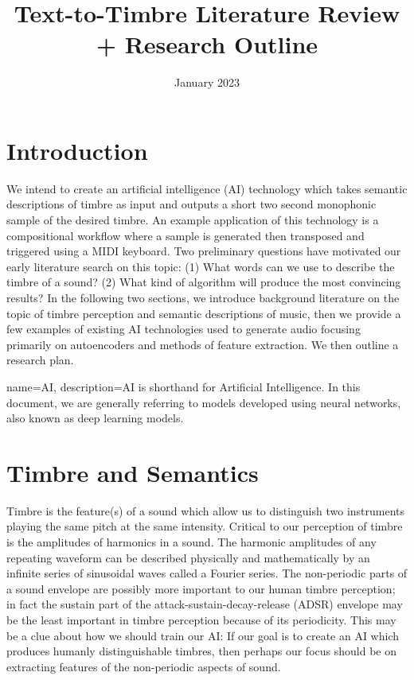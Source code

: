 \documentclass{article}
\title{Text-to-Timbre Literature Review + Research Outline }
\author{}
\date{January 2023}
\begin{document}
\maketitle

\section{Introduction}
We intend to create an artificial intelligence (\gls{AI}) technology which takes semantic descriptions of timbre as input and outputs a short two second monophonic sample of the desired timbre. An example application of this technology is a compositional workflow where a sample is generated then transposed and triggered using a MIDI keyboard. Two preliminary questions have motivated our early literature search on this topic: (1) What words can we use to describe the timbre of a sound? (2) What kind of algorithm will produce the most convincing results? In the following two sections, we introduce background literature on the topic of timbre perception and semantic descriptions of music, then we provide a few examples of existing AI technologies used to generate audio focusing primarily on autoencoders and methods of feature extraction. We then outline a research plan.

{
        name=AI,
        description={AI is shorthand for Artificial Intelligence. In this document, we are generally referring to models developed using neural networks, also known as deep learning models.}
}
    
\section{Timbre and Semantics}

Timbre is the feature(s) of a sound which allow us to distinguish two instruments playing the same pitch at the same intensity. Critical to our perception of timbre is the amplitudes of harmonics in a sound. The harmonic amplitudes of any repeating waveform can be described physically and mathematically by an infinite series of sinusoidal waves called a Fourier series. The non-periodic parts of a sound envelope are possibly more important to our human timbre perception; in fact the sustain part of the attack-sustain-decay-release (\gls{ADSR}) envelope may be the least important in timbre perception because of its periodicity.  \cite{Kai2019} This may be a clue about how we should train our AI: If our goal is to create an AI which produces humanly distinguishable timbres, then perhaps our focus should be on extracting features of the non-periodic aspects of sound.
\end{document}
